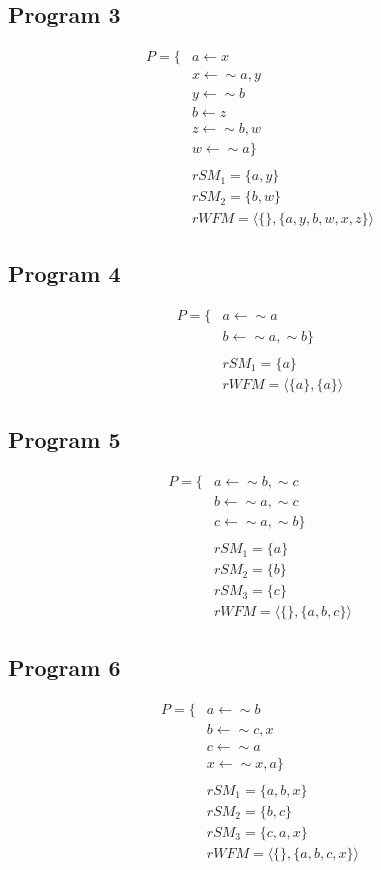 \subsection{Program 3}
\begin{align*}
P=\{
& a\leftarrow x\\
& x\leftarrow \sim a, y\\
& y\leftarrow \sim b\\
& b\leftarrow z\\
& z\leftarrow \sim b, w\\
& w\leftarrow \sim a
\}\\
\\
& rSM_{1}=\{a,y\}\\
& rSM_{2}=\{b,w\}\\
& rWFM=\langle\{\},\{a,y,b,w,x,z\}\rangle
\end{align*}

\subsection{Program 4}
\begin{align*}
P=\{
& a\leftarrow \sim a\\
& b\leftarrow \sim a, \sim b
\}\\
\\
& rSM_{1}=\{a\}\\
& rWFM=\langle\{a\},\{a\}\rangle\end{align*}

\subsection{Program 5}
\begin{align*}
P=\{
& a\leftarrow \sim b,\sim c\\
& b\leftarrow \sim a,\sim c\\
& c\leftarrow \sim a,\sim b
\}\\
\\
& rSM_{1}=\{a\}\\
& rSM_{2}=\{b\}\\
& rSM_{3}=\{c\}\\
& rWFM=\langle\{\},\{a,b,c\}\rangle\end{align*}

\subsection{Program 6}
\begin{align*}
P=\{
& a\leftarrow \sim b\\
& b\leftarrow \sim c,x\\
& c\leftarrow \sim a\\
& x\leftarrow \sim x,a
\}\\
\\
& rSM_{1}=\{a,b,x\}\\
& rSM_{2}=\{b,c\}\\
& rSM_{3}=\{c,a,x\}\\
& rWFM=\langle\{\},\{a,b,c,x\}\rangle\end{align*}

